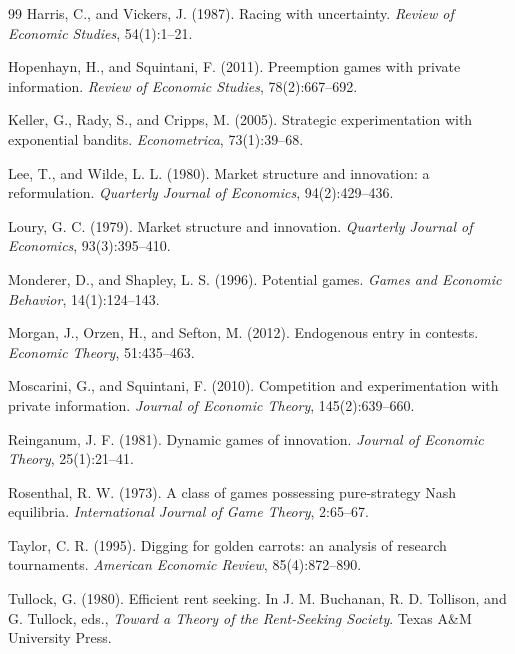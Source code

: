 \documentclass[11pt]{article}
\theoremstyle{itheads}
\begin{document}
\begin{thebibliography}{99}
Harris, C., and Vickers, J. (1987).
Racing with uncertainty.
\emph{Review of Economic Studies}, 54(1):1--21.

Hopenhayn, H., and Squintani, F. (2011).
Preemption games with private information.
\emph{Review of Economic Studies}, 78(2):667--692.

Keller, G., Rady, S., and Cripps, M. (2005).
Strategic experimentation with exponential bandits.
\emph{Econometrica}, 73(1):39--68.

Lee, T., and Wilde, L. L. (1980).
Market structure and innovation: a reformulation.
\emph{Quarterly Journal of Economics}, 94(2):429--436.

Loury, G. C. (1979).
Market structure and innovation.
\emph{Quarterly Journal of Economics}, 93(3):395--410.

Monderer, D., and Shapley, L. S. (1996).
Potential games.
\emph{Games and Economic Behavior}, 14(1):124--143.

Morgan, J., Orzen, H., and Sefton, M. (2012).
Endogenous entry in contests.
\emph{Economic Theory}, 51:435--463.

Moscarini, G., and Squintani, F. (2010).
Competition and experimentation with private information.
\emph{Journal of Economic Theory}, 145(2):639--660.

Reinganum, J. F. (1981).
Dynamic games of innovation.
\emph{Journal of Economic Theory}, 25(1):21--41.

Rosenthal, R. W. (1973).
A class of games possessing pure-strategy Nash equilibria.
\emph{International Journal of Game Theory}, 2:65--67.

Taylor, C. R. (1995).
Digging for golden carrots: an analysis of research tournaments.
\emph{American Economic Review}, 85(4):872--890.

Tullock, G. (1980).
Efficient rent seeking.
In J. M. Buchanan, R. D. Tollison, and G. Tullock, eds.,
\emph{Toward a Theory of the Rent-Seeking Society}.
Texas A\&M University Press.

\end{thebibliography}
\end{document}

